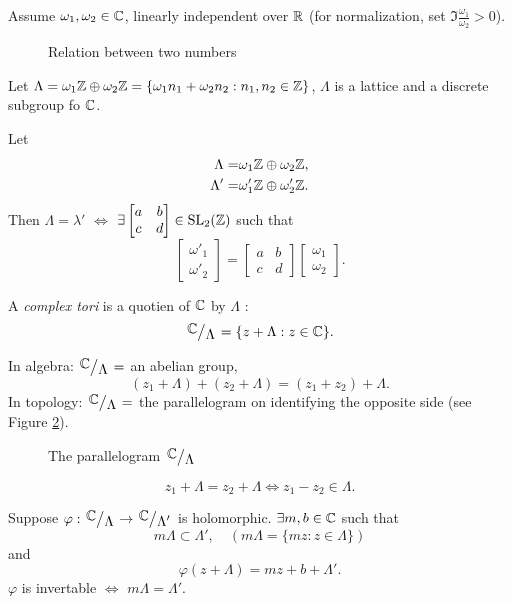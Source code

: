 Assume $\omega_1,\omega_2\in \mathbb{C}$, linearly independent over $\mathbb{R}$ (for normalization, set $\Im \frac{\omega_1}{\omega_2}>0$).
\begin{figure}[ht]
    \centering
    \caption{Relation between two numbers}
    \label{fig:relation-between-two-numbers}
\end{figure}

Let $\Lambda=\omega_1\mathbb{Z}\oplus\omega_2\mathbb{Z}=\{\omega_1n_1+\omega_2n_2:n_1,n_2\in \mathbb{Z}\} $, $\Lambda$ is a lattice and a discrete subgroup fo $\mathbb{C}$.
\begin{lemma}
  Let 
  \begin{align*}
    \Lambda=&\omega_1\mathbb{Z}\oplus \omega_2\mathbb{Z},\\
    \Lambda'=&\omega'_1\mathbb{Z}\oplus\omega'_2\mathbb{Z}
  .\end{align*}
Then $\Lambda=\lambda'$ $\Leftrightarrow$ $\exists \begin{bmatrix} a&b\\c&d \end{bmatrix} \in \operatorname{SL}_2(\mathbb{Z})$ such that 
\[
  \begin{bmatrix} \omega'_1\\\omega'_2 \end{bmatrix} =\begin{bmatrix} a&b\\c&d \end{bmatrix} \begin{bmatrix} \omega_1\\ \omega_2 \end{bmatrix}.
\]

\end{lemma}
\begin{definition}
  A \textit{complex tori} is a quotien of $\mathbb{C}$ by $\Lambda$ :
  \[
    \sfrac{\C}{\Lambda}=\{z+\Lambda:z\in \C\}. 
  \] 
\end{definition}
In algebra: $\sfrac{\C}{\Lambda}=$ an abelian group,
\[
  \left( z_1+\Lambda \right) +\left( z_2+\Lambda \right) =(z_1+z_2)+\Lambda.
\] 
In topology: $\sfrac{\C}{\Lambda}=$ the parallelogram on identifying the opposite side (see Figure \ref{fig:parallelogram}).
\begin{figure}[ht]
    \centering
    \caption{The parallelogram $\sfrac{\C}{\Lambda}$}
    \label{fig:parallelogram}
\end{figure}

\[
z_1+\Lambda=z_2+\Lambda\Leftrightarrow z_1-z_2 \in \Lambda.
\] 
\begin{proposition}
  Suppose $\varphi:\sfrac{\C}{\Lambda}\to \sfrac{\C}{\Lambda'}$ is holomorphic. $\exists m,b\in \mathbb{C}$ such that 
  \[
    m\Lambda\subset \Lambda',\quad \left( m\Lambda =\{mz:z\in \Lambda\}  \right) 
  \] 
  and 
  \[
    \varphi(z+\Lambda)=mz+b+\Lambda'.
  \] 
  $\varphi$ is invertable $\Leftrightarrow$ $m\Lambda=\Lambda'$.
\end{proposition}

